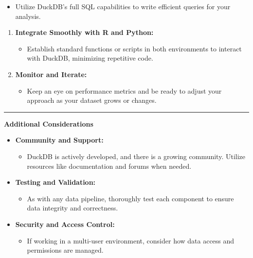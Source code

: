 \documentclass[
  american,
  10,
  a4paper,
]{book}
\providecommand{\tightlist}{%
  \setlength{\itemsep}{0pt}\setlength{\parskip}{0pt}}
\theoremstyle{definition}
\theoremstyle{remark}
\begin{document}
\begin{itemize}
\tightlist
\item
  Utilize DuckDB's full SQL capabilities to write efficient queries for
  your analysis.
\end{itemize}

\begin{enumerate}
\def\labelenumi{\arabic{enumi}.}
\setcounter{enumi}{2}
\item
  \textbf{Integrate Smoothly with R and Python:}

  \begin{itemize}
  \tightlist
  \item
    Establish standard functions or scripts in both environments to
    interact with DuckDB, minimizing repetitive code.
  \end{itemize}
\item
  \textbf{Monitor and Iterate:}

  \begin{itemize}
  \tightlist
  \item
    Keep an eye on performance metrics and be ready to adjust your
    approach as your dataset grows or changes.
  \end{itemize}
\end{enumerate}

\begin{center}\rule{0.5\linewidth}{0.5pt}\end{center}

\textbf{Additional Considerations}

\begin{itemize}
\item
  \textbf{Community and Support:}

  \begin{itemize}
  \tightlist
  \item
    DuckDB is actively developed, and there is a growing community.
    Utilize resources like documentation and forums when needed.
  \end{itemize}
\item
  \textbf{Testing and Validation:}

  \begin{itemize}
  \tightlist
  \item
    As with any data pipeline, thoroughly test each component to ensure
    data integrity and correctness.
  \end{itemize}
\item
  \textbf{Security and Access Control:}

  \begin{itemize}
  \tightlist
  \item
    If working in a multi-user environment, consider how data access and
    permissions are managed.
  \end{itemize}
\end{itemize}
\end{document}
